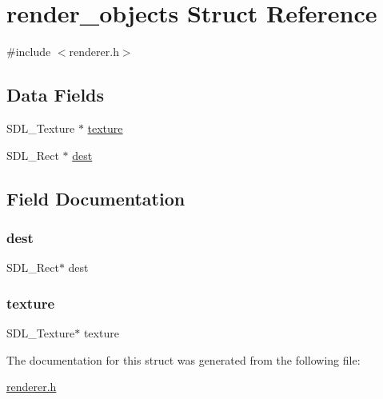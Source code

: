 \hypertarget{structrender__objects}{}\section{render\+\_\+objects Struct Reference}
\label{structrender__objects}


{\ttfamily \#include $<$renderer.\+h$>$}

\subsection*{Data Fields}
\begin{DoxyCompactItemize}
\item 
S\+D\+L\+\_\+\+Texture $\ast$ \mbox{\hyperlink{structrender__objects_a859b8efbf9abe8e82757ee5c75a0c97c}{texture}}
\item 
S\+D\+L\+\_\+\+Rect $\ast$ \mbox{\hyperlink{structrender__objects_ad596863ebba46abf47d8fe6b946dc991}{dest}}
\end{DoxyCompactItemize}


\subsection{Field Documentation}
\mbox{\label{structrender__objects_ad596863ebba46abf47d8fe6b946dc991}} 
\subsubsection{\texorpdfstring{dest}{dest}}
{\footnotesize\ttfamily S\+D\+L\+\_\+\+Rect$\ast$ dest}

\mbox{\label{structrender__objects_a859b8efbf9abe8e82757ee5c75a0c97c}} 
\subsubsection{\texorpdfstring{texture}{texture}}
{\footnotesize\ttfamily S\+D\+L\+\_\+\+Texture$\ast$ texture}



The documentation for this struct was generated from the following file\+:\begin{DoxyCompactItemize}
\item 
\mbox{\hyperlink{renderer_8h}{renderer.\+h}}\end{DoxyCompactItemize}
